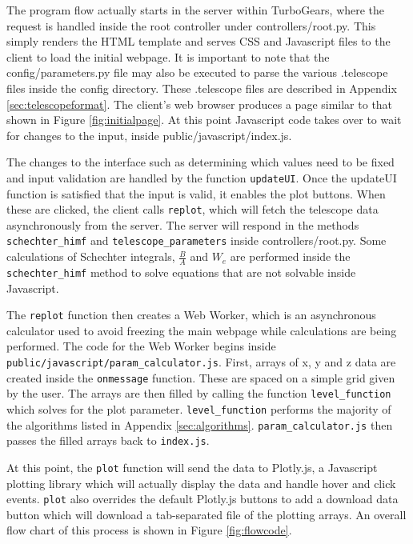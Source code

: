 \documentclass[11pt]{article}
\begin{document}
The program flow actually starts in the server within TurboGears, where the request is handled inside the root controller under controllers/root.py. This simply renders the HTML template and serves CSS and Javascript files to the client to load the initial webpage. It is important to note that the config/parameters.py file may also be executed to parse the various .telescope files inside the config directory. These .telescope files are described in Appendix \ref{sec:telescopeformat}. The client's web browser produces a page similar to that shown in Figure \ref{fig:initialpage}. At this point Javascript code takes over to wait for changes to the input, inside public/javascript/index.js.

The changes to the interface such as determining which values need to be fixed and input validation are handled by the function \texttt{updateUI}. Once the updateUI function is satisfied that the input is valid, it enables the plot buttons. When these are clicked, the client calls \texttt{replot}, which will fetch the telescope data asynchronously from the server. The server will respond in the methods \verb|schechter_himf| and \verb|telescope_parameters| inside controllers/root.py. Some calculations of Schechter integrals, $\frac{B}{A}$ and $W_e$ are performed inside the \verb|schechter_himf| method to solve equations that are not solvable inside Javascript.

The \texttt{replot} function then creates a Web Worker, which is an asynchronous calculator used to avoid freezing the main webpage while calculations are being performed. The code for the Web Worker begins inside \verb|public/javascript/param_calculator.js|. First, arrays of x, y and z data are created inside the \texttt{onmessage} function. These are spaced on a simple grid given by the user. The arrays are then filled by calling the function \verb|level_function| which solves for the plot parameter. \verb|level_function| performs the majority of the algorithms listed in Appendix \ref{sec:algorithms}. \verb|param_calculator.js| then passes the filled arrays back to \verb|index.js|. 

At this point, the \texttt{plot} function will send the data to Plotly.js, a Javascript plotting library which will actually display the data and handle hover and click events. \texttt{plot} also overrides the default Plotly.js buttons to add a download data button which will download a tab-separated file of the plotting arrays. An overall flow chart of this process is shown in Figure \ref{fig:flowcode}.
\end{document}
